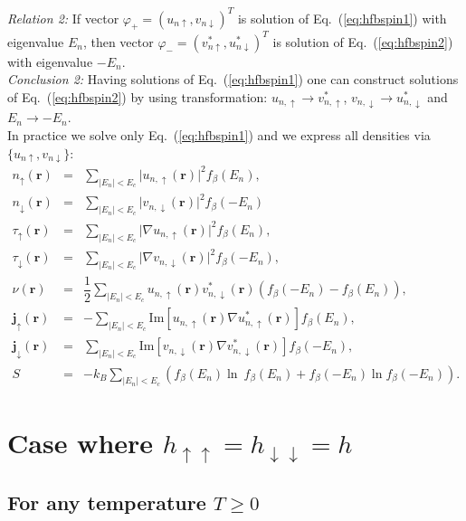 \documentclass[a4paper,10pt]{article}
\newcommand{\abs}[1]{\lvert{#1}\rvert}            %
\begin{document}
\noindent\textit{Relation 2:} If vector $\varphi_{+}=\left( u_{n\uparrow},v_{n\downarrow}\right)^{T}$ is solution of Eq.~(\ref{eq:hfbspin1}) with eigenvalue $E_n$, then vector $\varphi_{-}=(v_{n\uparrow}^*,u_{n\downarrow}^*)^{T}$ is solution of Eq.~(\ref{eq:hfbspin2}) with eigenvalue $-E_n$.\\

\noindent\textit{Conclusion 2:} Having solutions of Eq.~(\ref{eq:hfbspin1}) one can construct solutions of Eq.~(\ref{eq:hfbspin2}) by using transformation: $u_{n,\uparrow}\rightarrow v_{n,\uparrow}^*$, $v_{n,\downarrow}\rightarrow u_{n,\downarrow}^*$ and $E_n\rightarrow -E_n$. \\
In practice we solve only Eq.~(\ref{eq:hfbspin1}) and we express all densities via $\{u_{n\uparrow},v_{n\downarrow}\}$:
\begin{eqnarray}
n_{\uparrow}(\bm{r}) &=& \sum_{|E_n|<E_c}\abs{u_{n,\uparrow}(\bm{r})}^2 f_{\beta}(E_n),\\
n_{\downarrow}(\bm{r}) &=& \sum_{|E_n|<E_c}\abs{v_{n,\downarrow}(\bm{r})}^2 f_{\beta}(-E_n)\\
\tau_{\uparrow}(\bm{r}) &=& \sum_{|E_n|<E_c}\abs{\nabla u_{n,\uparrow}(\bm{r})}^2 f_{\beta}(E_n),\\
\tau_{\downarrow}(\bm{r}) &=& \sum_{|E_n|<E_c}\abs{\nabla v_{n,\downarrow}(\bm{r})}^2 f_{\beta}(-E_n),\\
\nu(\bm{r}) &=& \dfrac{1}{2}\sum_{|E_n|<E_c} u_{n,\uparrow}(\bm{r})v_{n,\downarrow}^{*}(\bm{r})\left( f_{\beta}(-E_n)-f_{\beta}(E_n)\right) ,\\
\bm{j}_{\uparrow}(\bm{r}) &=& -\sum_{|E_n|<E_c} \textrm{Im}[u_{n,\uparrow}(\bm{r})\nabla u_{n,\uparrow}^*(\bm{r})] f_{\beta}(E_n),\\
\bm{j}_{\downarrow}(\bm{r}) &=& \sum_{|E_n|<E_c} \textrm{Im}[v_{n,\downarrow}(\bm{r})\nabla v_{n,\downarrow}^*(\bm{r})] f_{\beta}(-E_n),\\
S&=&-k_B\sum_{|E_n|<E_c}\left( f_{\beta}(E_n)\ln\ f_{\beta}(E_n) + f_{\beta}(-E_n)\ln f_{\beta}(-E_n)\right).  
\label{eqn:densities1}
\end{eqnarray}

\section{Case where $h_{\uparrow \uparrow}=h_{\downarrow \downarrow}=h$}

\subsection{For any temperature $T \ge 0$}
\end{document}
